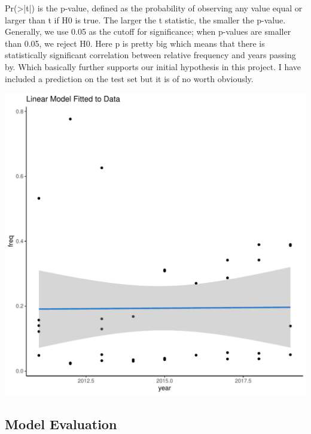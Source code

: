 \documentclass[10pt]{article}\usepackage[]{graphicx}\usepackage[]{color}
\makeatletter
\def\maxwidth{ %
  \ifdim\Gin@nat@width>\linewidth
    \linewidth
  \else
    \Gin@nat@width
  \fi
}
\newenvironment{kframe}{%
 \def\at@end@of@kframe{}%
 \ifinner\ifhmode%
  \def\at@end@of@kframe{\end{minipage}}%
  \begin{minipage}{\columnwidth}%
 \fi\fi%
 \def\FrameCommand##1{\hskip\@totalleftmargin \hskip-\fboxsep
 \colorbox{shadecolor}{##1}\hskip-\fboxsep
     \hskip-\linewidth \hskip-\@totalleftmargin \hskip\columnwidth}%
 \MakeFramed {\advance\hsize-\width
   \@totalleftmargin\z@ \linewidth\hsize
   \@setminipage}}%
 {\par\unskip\endMakeFramed%
 \at@end@of@kframe}
\newenvironment{knitrout}{}{} %
\makeatother
\begin{document}
Pr(>|t|) is the p-value, defined as the probability of observing any value equal or larger than t if H0 is true. The larger the t statistic, the smaller the p-value. Generally, we use 0.05 as the cutoff for significance; when p-values are smaller than 0.05, we reject H0. Here p is pretty big which means that there is statistically significant correlation between relative frequency and years passing by. Which basically further supports our initial hypothesis in this project. I have included a prediction on the test set but it is of no worth obviously.\\

\begin{knitrout}
\color{fgcolor}\begin{kframe}


{\ttfamily\noindent\itshape{}}\end{kframe}
\includegraphics[width=\maxwidth]{figure/unnamed-chunk-20-1} 

\end{knitrout}



\subsection{Model Evaluation}
\end{document}
